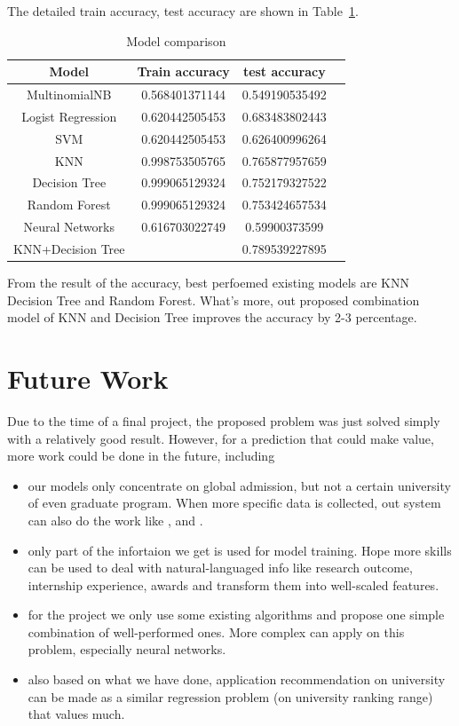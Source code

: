 \documentclass{article}
\begin{document}
The detailed train accuracy, test accuracy are shown in Table~\ref{tab: Model_comparison}.

\begin{table}[htbp]
\centering
\begin{tabular}{cccc}
    \hline
    Model & Train accuracy & test accuracy\\
    \hline
    MultinomialNB & 0.568401371144 & 0.549190535492\\
    \hline
    Logist Regression & 0.620442505453 & 0.683483802443\\
    \hline
    SVM & 0.620442505453 & 0.626400996264\\
    \hline
    KNN & 0.998753505765 & 0.765877957659\\
    \hline
    Decision Tree & 0.999065129324 & 0.752179327522\\
    \hline
    Random Forest & 0.999065129324 & 0.753424657534\\
    \hline
    Neural Networks & 0.616703022749 & 0.59900373599\\
    \hline
    KNN+Decision Tree &  & 0.789539227895\\
    \hline
    \end{tabular}
\caption{Model comparison}
\label{tab: Model_comparison}
\end{table}

From the result of the accuracy, best perfoemed existing models are KNN Decision Tree and Random Forest. What's more, out proposed combination model of KNN and Decision Tree improves the accuracy by 2-3 percentage.

\section{Future Work}

Due to the time of a final project, the proposed problem was just solved simply with a relatively good result. However, for a prediction that could make value, more work could be done in the future, including

\begin{itemize}
    \item our models only concentrate on global admission, but not a certain university of even graduate program. When more specific data is collected, out system can also do the work like \cite{bruggink1996statistical}, \cite{moore1998expert} and \cite{gupta2016will}.
    \item only part of the infortaion we get is used for model training. Hope more skills can be used to deal with natural-languaged info like research outcome, internship experience, awards and transform them into well-scaled features.
    \item for the project we only use some existing algorithms and propose one simple combination of well-performed ones. More complex can apply on this problem, especially neural networks.
    \item also based on what we have done, application recommendation on university can be made as a similar regression problem (on university ranking range) that values much.
\end{itemize}
\end{document}
